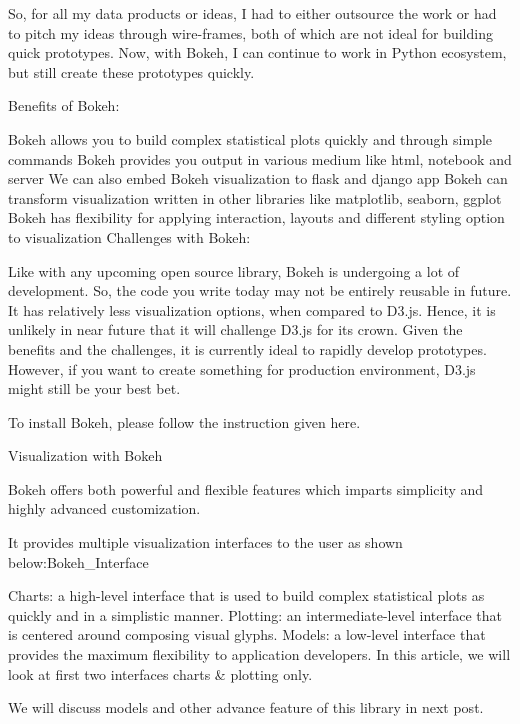 So, for all my data products or ideas, I had to either outsource the work or had to pitch my ideas through wire-frames, both of which are not ideal for building quick prototypes. Now, with Bokeh, I can continue to work in Python ecosystem, but still create these prototypes quickly.

Benefits of Bokeh:

Bokeh allows you to build complex statistical plots quickly and through simple commands
Bokeh provides you output in various medium like html, notebook and server
We can also embed Bokeh visualization to flask and django app
Bokeh can transform visualization written in other libraries like matplotlib, seaborn, ggplot
Bokeh has flexibility for applying interaction, layouts and different styling option to visualization
Challenges with Bokeh:

Like with any upcoming open source library, Bokeh is undergoing a lot of development. So, the code you write today may not be entirely reusable in future.
It has relatively less visualization options, when compared to D3.js. Hence, it is unlikely in near future that it will challenge D3.js for its crown.
Given the benefits and the challenges, it is currently ideal to rapidly develop prototypes. However, if you want to create something for production environment, D3.js might still be your best bet.

To install Bokeh, please follow the instruction given here.



Visualization with Bokeh

Bokeh offers both powerful and flexible features which imparts simplicity and highly advanced customization. 



It provides multiple visualization interfaces to the user as shown below:Bokeh_Interface

Charts: a high-level interface that is used to build complex statistical plots as quickly and in a simplistic manner.
Plotting: an intermediate-level interface that is centered around composing visual glyphs.
Models: a low-level interface that provides the maximum flexibility to application developers.
In this article, we will look at first two interfaces charts & plotting only. 

We will discuss models and other advance feature of this library in next post.



